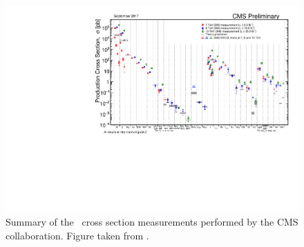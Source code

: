 \begin{figure}[htbp]
	\centering
	\includegraphics[width=1.\linewidth]{1_Introduction/Figures/SigmaNew_v0}
	\caption{Summary of the \SM\ cross section measurements performed by the CMS collaboration. Figure taken from \cite{summarywiki}.}
	\label{fig:sigmanewv0}
\end{figure}

